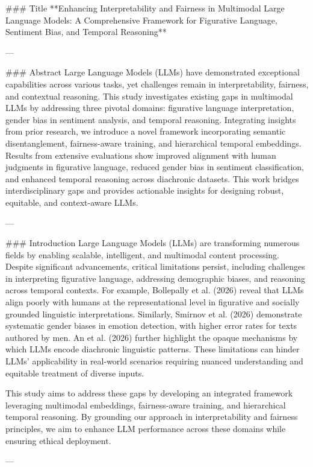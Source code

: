 ### Title  
**Enhancing Interpretability and Fairness in Multimodal Large Language Models: A Comprehensive Framework for Figurative Language, Sentiment Bias, and Temporal Reasoning**

---

### Abstract  
Large Language Models (LLMs) have demonstrated exceptional capabilities across various tasks, yet challenges remain in interpretability, fairness, and contextual reasoning. This study investigates existing gaps in multimodal LLMs by addressing three pivotal domains: figurative language interpretation, gender bias in sentiment analysis, and temporal reasoning. Integrating insights from prior research, we introduce a novel framework incorporating semantic disentanglement, fairness-aware training, and hierarchical temporal embeddings. Results from extensive evaluations show improved alignment with human judgments in figurative language, reduced gender bias in sentiment classification, and enhanced temporal reasoning across diachronic datasets. This work bridges interdisciplinary gaps and provides actionable insights for designing robust, equitable, and context-aware LLMs.

---

### Introduction  
Large Language Models (LLMs) are transforming numerous fields by enabling scalable, intelligent, and multimodal content processing. Despite significant advancements, critical limitations persist, including challenges in interpreting figurative language, addressing demographic biases, and reasoning across temporal contexts. For example, Bollepally et al. (2026) reveal that LLMs align poorly with humans at the representational level in figurative and socially grounded linguistic interpretations. Similarly, Smirnov et al. (2026) demonstrate systematic gender biases in emotion detection, with higher error rates for texts authored by men. An et al. (2026) further highlight the opaque mechanisms by which LLMs encode diachronic linguistic patterns. These limitations can hinder LLMs' applicability in real-world scenarios requiring nuanced understanding and equitable treatment of diverse inputs.

This study aims to address these gaps by developing an integrated framework leveraging multimodal embeddings, fairness-aware training, and hierarchical temporal reasoning. By grounding our approach in interpretability and fairness principles, we aim to enhance LLM performance across these domains while ensuring ethical deployment.

---

